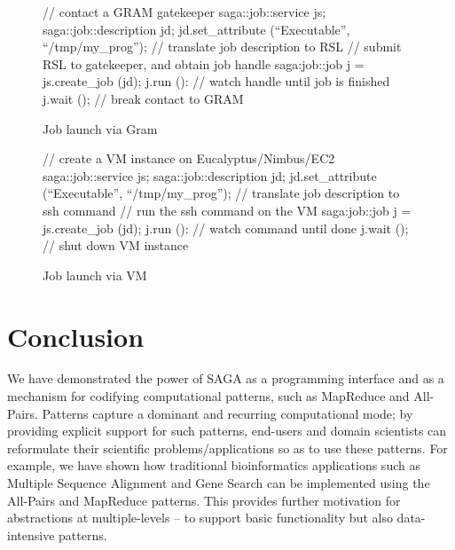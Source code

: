 \documentclass[conference,final]{IEEEtran}
\begin{document}

\begin{figure}[!ht]
 \begin{center}
  \begin{mycode}[label=SAGA Job Launch via GRAM gatekeeper]
   { // contact a GRAM gatekeeper
    saga::job::service     js;
    saga::job::description jd;
    jd.set_attribute (``Executable'', ``/tmp/my_prog'');
    // translate job description to RSL
    // submit RSL to gatekeeper, and obtain job handle
    saga:job::job j = js.create_job (jd);
    j.run ():
    // watch handle until job is finished
    j.wait ();
   } // break contact to GRAM
  \end{mycode}
  \caption{\label{gramjob}Job launch via Gram }
 \end{center}
\end{figure}


\begin{figure}[!ht]
 \begin{center}
  \begin{mycode}[label=SAGA create a VM instance on a Cloud]
   {// create a VM instance on Eucalyptus/Nimbus/EC2
    saga::job::service     js;
    saga::job::description jd;
    jd.set_attribute (``Executable'', ``/tmp/my_prog'');
    // translate job description to ssh command
    // run the ssh command on the VM
    saga:job::job j = js.create_job (jd);
    j.run ():
    // watch command until done
    j.wait ();
   } // shut down VM instance
  \end{mycode}
  \caption{\label{vmjob} Job launch via VM}
 \end{center}
\end{figure}


\section{Conclusion}
We have demonstrated the power of SAGA as a programming interface and
as a mechanism for codifying computational patterns, such as MapReduce
and All-Pairs.  Patterns capture a dominant and recurring
computational mode; by providing explicit support for such patterns,
end-users and domain scientists can reformulate their scientific
problems/applications so as to use these patterns. For example, we
have shown how traditional bioinformatics applications such as Multiple
Sequence Alignment and Gene Search can be implemented using the
All-Pairs and MapReduce patterns. This provides further motivation for
abstractions at multiple-levels -- to support basic functionality but
also data-intensive patterns.
\end{document}
